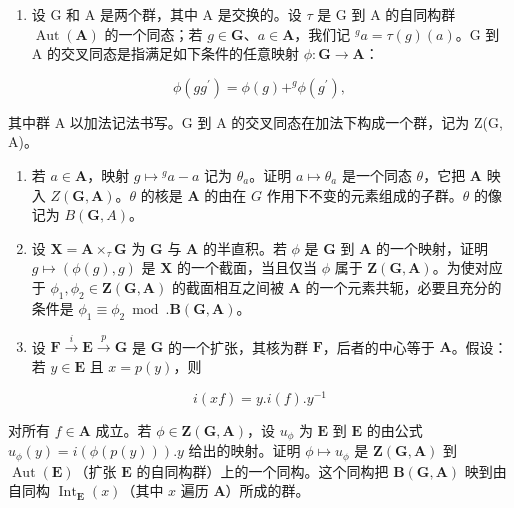 \begin{enumerate}
\def\labelenumi{\arabic{enumi}。}
\setcounter{enumi}{6}
\tightlist
\item
  设 G 和 A 是两个群，其中 A 是交换的。设 \(\tau\) 是 G 到 A 的自同构群 \(\operatorname{Aut}(\mathbf{A})\) 的一个同态；若 \(g \in \mathbf{G}\)、\(a \in \mathbf{A}\)，我们记 \(^g a = \tau(g)(a)\)。G 到 A 的交叉同态是指满足如下条件的任意映射 \(\phi: \mathbf{G} \to \mathbf{A}\)：
\end{enumerate}

\[
\phi (g g ^ {\prime}) = \phi (g) + ^ {g} \phi (g ^ {\prime}),
\]

其中群 A 以加法记法书写。G 到 A 的交叉同态在加法下构成一个群，记为 Z(G, A)。

\begin{enumerate}
\def\labelenumi{(\alph{enumi})}
\item
  若 \(a \in \mathbf{A}\)，映射 \(g \mapsto {}^g a - a\) 记为 \(\theta_a\)。证明 \(a \mapsto \theta_a\) 是一个同态 \(\theta\)，它把 \(\mathbf{A}\) 映入 \(Z(\mathbf{G}, \mathbf{A})\)。\(\theta\) 的核是 \(\mathbf{A}\) 的由在 \(G\) 作用下不变的元素组成的子群。\(\theta\) 的像记为 \(B(\mathbf{G}, A)\)。
\item
  设 \(\mathbf{X} = \mathbf{A} \times_{\tau} \mathbf{G}\) 为 \(\mathbf{G}\) 与 \(\mathbf{A}\) 的半直积。若 \(\phi\) 是 \(\mathbf{G}\) 到 \(\mathbf{A}\) 的一个映射，证明 \(g \mapsto (\phi(g), g)\) 是 \(\mathbf{X}\) 的一个截面，当且仅当 \(\phi\) 属于 \(\mathbf{Z}(\mathbf{G}, \mathbf{A})\)。为使对应于 \(\phi_1, \phi_2 \in \mathbf{Z}(\mathbf{G}, \mathbf{A})\) 的截面相互之间被 \(\mathbf{A}\) 的一个元素共轭，必要且充分的条件是 \(\phi_1 \equiv \phi_2 \bmod. \mathbf{B}(\mathbf{G}, \mathbf{A})\)。
\item
  设 \(\mathbf{F} \xrightarrow{i} \mathbf{E} \xrightarrow{p} \mathbf{G}\) 是 \(\mathbf{G}\) 的一个扩张，其核为群 \(\mathbf{F}\)，后者的中心等于 \(\mathbf{A}\)。假设：若 \(y \in \mathbf{E}\) 且 \(x = p(y)\)，则
\end{enumerate}

\[
i (x f) = y. i (f). y ^ {- 1}
\]

对所有 \(f \in \mathbf{A}\) 成立。若 \(\phi \in \mathbf{Z}(\mathbf{G}, \mathbf{A})\)，设 \(u_{\phi}\) 为 \(\mathbf{E}\) 到 \(\mathbf{E}\) 的由公式 \(u_{\phi}(y) = i(\phi(p(y))) .y\) 给出的映射。证明 \(\phi \mapsto u_{\phi}\) 是 \(\mathbf{Z}(\mathbf{G}, \mathbf{A})\) 到 \(\operatorname{Aut}(\mathbf{E})\)（扩张 \(\mathbf{E}\) 的自同构群）上的一个同构。这个同构把 \(\mathbf{B}(\mathbf{G}, \mathbf{A})\) 映到由自同构 \(\operatorname{Int}_{\mathbf{E}}(x)\)（其中 \(x\) 遍历 \(\mathbf{A}\)）所成的群。

